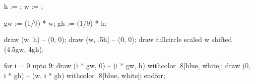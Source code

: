 

	h := \overlayheight;
	w := \overlaywidth;

	gw := (1/9) * w;
	gh := (1/9) * h;

	draw (w, h)   -- (0, 0);
	draw (w, .5h) -- (0, 0);
	draw fullcircle scaled w shifted (4.5gw, 4gh);

	for i = 0 upto 9:
		draw (i * gw, 0) -- (i * gw, h) withcolor .8[blue, white];
		draw (0, i * gh) -- (w, i * gh) withcolor .8[blue, white];
	endfor;

\stopuniqueMPgraphic

